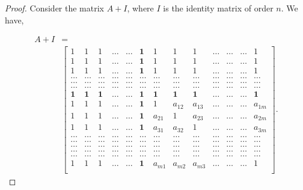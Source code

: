 \documentclass[10pt,a4paper]{amsart}
\begin{document}
\begin{proof}
		
		Consider the matrix $A+I$, where $I$ is the identity matrix of order $n$.
		We have,
		
		\begin{equation}
			\label{Eq1}
			\begin{split}
				A+I&=
				\\
				&
				\left[
				\begin{array}{cccccccccccccccccc}
					1 & 1 & 1& \ldots &\dots & \textbf{1}&1 & 1 & 1& \ldots&\ldots &\ldots& 1\\
					1 & 1 & 1& \ldots &\dots &\textbf{1}&1 & 1 & 1& \ldots &\ldots&\ldots& 1\\
					1& 1 & 1 &\ldots&\dots& \textbf{1}&1 & 1 & 1& \ldots &\ldots&\ldots& 1\\
					\ldots& \ldots &\ldots &\ldots&\ldots& \ldots &\ldots &\ldots&\ldots&\ldots&\ldots&\ldots&\ldots\\
					\ldots& \ldots &\ldots &\ldots&\ldots& \ldots &\ldots &\ldots&\ldots&\ldots&\ldots&\ldots&\ldots\\
					\ldots& \ldots &\ldots &\ldots&\ldots& \ldots &\ldots &\ldots&\ldots&\ldots&\ldots&\ldots&\ldots\\
					\textbf{1}& \textbf{1} &\textbf{1}&\ldots &\ldots& \textbf{1} &\textbf{1} & \textbf{1} & \textbf{1}& \ldots &\ldots&\ldots& \textbf{1}\\
					1 & 1 &1  & \ldots&\ldots&\textbf{1} & 1 & a_{12} &a_{13}& \ldots&\ldots&\ldots&a_{1m}\\
					1 & 1 &1 & \ldots&\ldots & \textbf{1}& a_{21} & 1 &a_{23}& \ldots&\ldots&\ldots&a_{2m}\\
					1& 1 & 1 &\ldots&\dots& \textbf{1}&a_{31} & a_{32} & 1& \ldots &\ldots&\ldots& a_{3m}\\
					\ldots& \ldots &\ldots &\ldots&\ldots& \ldots &\ldots &\ldots&\ldots& \ldots&\ldots&\ldots&\ldots \\
					\ldots& \ldots &\ldots &\ldots&\ldots& \ldots &\ldots &\ldots&\ldots& \ldots &\ldots&\ldots&\ldots\\
					\ldots& \ldots &\ldots &\ldots&\ldots& \ldots &\ldots &\ldots&\ldots& \ldots &\ldots&\ldots&\ldots\\
					\ldots& \ldots &\ldots &\ldots&\ldots& \ldots &\ldots &\ldots&\ldots& \ldots &\ldots&\ldots&\ldots\\
					\ldots& \ldots &\ldots &\ldots&\ldots& \ldots &\ldots &\ldots&\ldots&\ldots&\ldots&\ldots&\ldots\\
					1 & 1 & 1 &  \ldots& \dots&\textbf{1}& a_{m1} & a_{m2} &  a_{m3}&\ldots&\ldots&\ldots& 1\\
				\end{array}
				\right].
			\end{split}
		\end{equation}
		

\end{proof}
\end{document}
